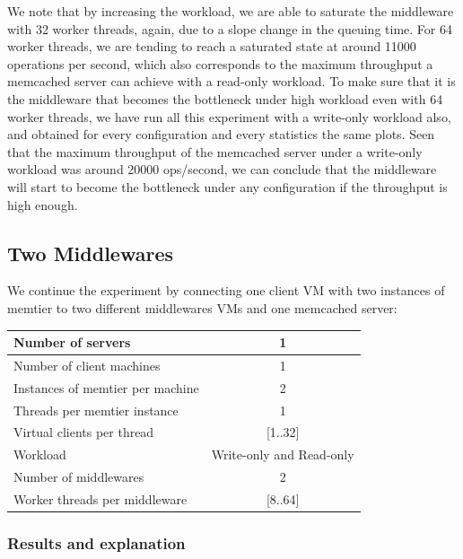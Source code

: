 \documentclass[11pt,a4paper]{article}
\begin{document}
We note that by increasing the workload, we are able to saturate the middleware with 32 worker threads, again, due to a slope change in the queuing time. For 64 worker threads, we are tending to reach a saturated state at around 11000 operations per second, which also corresponds to the maximum throughput a memcached server can achieve with a read-only workload. To make sure that it is the middleware that becomes the bottleneck under high workload even with 64 worker threads, we have run all this experiment with a write-only workload also, and obtained for every configuration and every statistics the same plots. Seen that the maximum throughput of the memcached server under a write-only workload was around 20000 ops/second, we can conclude that the middleware will start to become the bottleneck under any configuration if the throughput is high enough. 
   
\subsection{Two Middlewares}

We continue the experiment by connecting one client VM with two instances of memtier to two different middlewares VMs and one memcached server:

\begin{center}
	\scriptsize{
		\begin{tabular}{|l|c|}
			\hline Number of servers                & 1                        \\ 
			\hline Number of client machines        & 1                        \\ 
			\hline Instances of memtier per machine & 2                        \\ 
			\hline Threads per memtier instance     & 1                        \\
			\hline Virtual clients per thread       & [1..32]                  \\ 
			\hline Workload                         & Write-only and Read-only \\
			\hline Number of middlewares            & 2                        \\
			\hline Worker threads per middleware    & [8..64]                  \\
			\hline 
		\end{tabular}
	} 
\end{center}
\subsubsection{Results and explanation}
\end{document}
